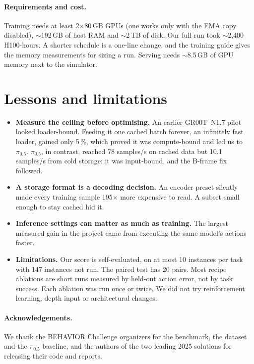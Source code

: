 \documentclass[10pt]{article}
\newcommand{\pizf}{$\pi_{0.5}$}
\begin{document}
\paragraph{Requirements and cost.} Training needs at least 2$\times$80\,GB GPUs (one works only with the EMA copy
disabled), $\sim$192\,GB of host RAM and $\sim$2\,TB of disk. Our full run took $\sim$2{,}400 H100-hours. A shorter
schedule is a one-line change, and the training guide gives the memory measurements for sizing a run. Serving needs
$\sim$8.5\,GB of GPU memory next to the simulator.

\section{Lessons and limitations}
\begin{itemize}
\item \textbf{Measure the ceiling before optimising.} An earlier GR00T~N1.7 pilot looked loader-bound. Feeding it one
  cached batch forever, an infinitely fast loader, gained only 5\,\%, which proved it was compute-bound and led us to
  \pizf{}. \pizf{}, in contrast, reached 78 samples/s on cached data but 10.1 samples/s from cold storage: it was input-bound, and the B-frame fix followed.
\item \textbf{A storage format is a decoding decision.} An encoder preset silently made every training sample
  195$\times$ more expensive to read. A subset small enough to stay cached hid it.
\item \textbf{Inference settings can matter as much as training.} The largest measured gain in the project came from
  executing the same model's actions faster.
\item \textbf{Limitations.} Our score is self-evaluated, on at most 10 instances per task with 147 instances not run.
  The paired test has 20 pairs. Most recipe ablations are short runs measured by held-out action error, not by task
  success. Each ablation was run once or twice. We did not try reinforcement learning, depth input or architectural
  changes.
\end{itemize}

\paragraph{Acknowledgements.} We thank the BEHAVIOR Challenge organizers for the benchmark, the dataset and the
\pizf{} baseline, and the authors of the two leading 2025 solutions for releasing their code and reports.
\end{document}
